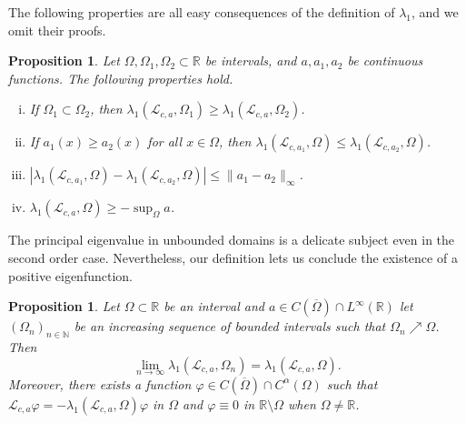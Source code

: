 \documentclass[11pt,a4paper]{amsart}
\newcommand{\Lop}{\mathcal{L}}
\newcommand{\R}{\mathbb{R}}
\newcommand{\N}{\mathbb{N}}
\renewcommand{\phi}{\varphi}
\newtheorem{prop}[thm]{Proposition}
\begin{document}
The following properties are all easy consequences of the definition of $\lambda_1$, and we omit their proofs.

\begin{prop} 
\label{prop:eig_properties}
Let $\Omega, \Omega_1, \Omega_2 \subset\R$ be intervals, and $a, a_1, a_2$ be continuous functions. The following properties hold.  
\begin{enumerate}[(i)]
\item If $\Omega_1 \subset \Omega_2$, then $\lambda_1(\Lop_{c,a}, \Omega_1) \geq \lambda_1(\Lop_{c,a}, \Omega_2)$.
\item If $a_1 (x) \geq a_2(x)$ for all $x\in \Omega$, then $\lambda_1(\Lop_{c,a_1},\Omega) \leq \lambda_1(\Lop_{c,a_2}, \Omega)$.
\item $|\lambda_1(\Lop_{c,a_1}, \Omega) - \lambda_1(\Lop_{c,a_2}, \Omega)| \leq \|a_1 - a_2 \|_{\infty}$.
\item $\lambda_1(\Lop_{c,a}, \Omega) \geq -\sup_{\Omega} a$.
\end{enumerate}
\end{prop}

The principal eigenvalue in unbounded domains is a delicate subject even in the second order case. Nevertheless, our definition lets us conclude the existence of a positive eigenfunction. 

\begin{prop}
\label{prop:eigfunct_continuity}
Let $\Omega\subset \R$ be an interval and $a\in C(\overline{\Omega})\cap L^{\infty}(\R)$ let $(\Omega_n)_{n\in \N}$ be an increasing sequence of bounded intervals such that $\Omega_n\nearrow \Omega$. Then
\[\lim_{n\rightarrow\infty} \lambda_1(\Lop_{c,a},\Omega_n) = \lambda_1(\Lop_{c,a},\Omega).\]
Moreover, there exists a function $\phi \in C(\overline{\Omega}) \cap C^{\alpha}(\Omega)$ such that $ \Lop_{c,a} \phi =-\lambda_1(\Lop_{c,a},\Omega) \phi$ in $\Omega$ and $\phi\equiv 0$ in $\R\setminus \Omega$ when $\Omega \neq \R$.
\end{prop}
\end{document}
